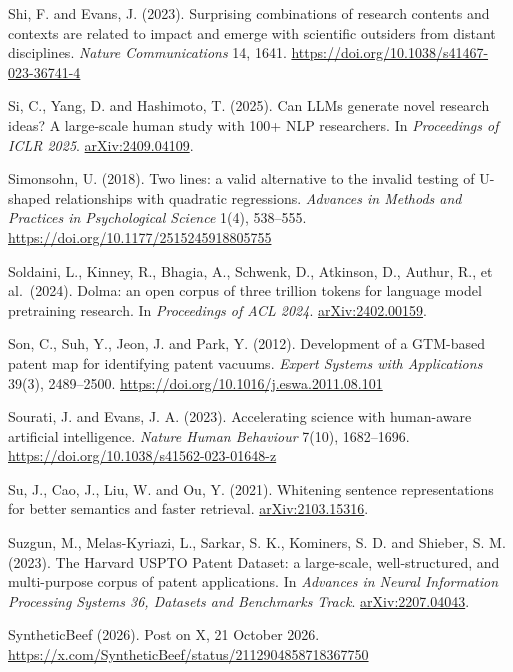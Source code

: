 \documentclass[
  10pt,
]{article}
\begin{document}
\hypertarget{ref-Shi2023}{}Shi, F. and
Evans, J. (2023). Surprising
combinations of research contents and
contexts are related to impact and
emerge with scientific outsiders from
distant disciplines. \emph{Nature
Communications} 14, 1641.
\url{https://doi.org/10.1038/s41467-023-36741-4}

\hypertarget{ref-Si2025}{}Si, C., Yang,
D. and Hashimoto, T. (2025). Can LLMs
generate novel research ideas? A
large-scale human study with 100+ NLP
researchers. In \emph{Proceedings of
ICLR 2025}.
\href{https://arxiv.org/abs/2409.04109}{arXiv:2409.04109}.

\hypertarget{ref-Simonsohn2018}{}Simonsohn,
U. (2018). Two lines: a valid
alternative to the invalid testing of
U-shaped relationships with quadratic
regressions. \emph{Advances in Methods
and Practices in Psychological Science}
1(4), 538--555.
\url{https://doi.org/10.1177/2515245918805755}

\hypertarget{ref-Soldaini2024}{}Soldaini,
L., Kinney, R., Bhagia, A., Schwenk, D.,
Atkinson, D., Authur, R., et al.~(2024).
Dolma: an open corpus of three trillion
tokens for language model pretraining
research. In \emph{Proceedings of ACL
2024}.
\href{https://arxiv.org/abs/2402.00159}{arXiv:2402.00159}.

\hypertarget{ref-Son2012}{}Son, C., Suh,
Y., Jeon, J. and Park, Y. (2012).
Development of a GTM-based patent map
for identifying patent vacuums.
\emph{Expert Systems with Applications}
39(3), 2489--2500.
\url{https://doi.org/10.1016/j.eswa.2011.08.101}

\hypertarget{ref-Sourati2023}{}Sourati,
J. and Evans, J. A. (2023). Accelerating
science with human-aware artificial
intelligence. \emph{Nature Human
Behaviour} 7(10), 1682--1696.
\url{https://doi.org/10.1038/s41562-023-01648-z}

\hypertarget{ref-Su2021}{}Su, J., Cao,
J., Liu, W. and Ou, Y. (2021). Whitening
sentence representations for better
semantics and faster retrieval.
\href{https://arxiv.org/abs/2103.15316}{arXiv:2103.15316}.

\hypertarget{ref-Suzgun2023}{}Suzgun,
M., Melas-Kyriazi, L., Sarkar, S. K.,
Kominers, S. D. and Shieber, S. M.
(2023). The Harvard USPTO Patent
Dataset: a large-scale, well-structured,
and multi-purpose corpus of patent
applications. In \emph{Advances in
Neural Information Processing Systems
36, Datasets and Benchmarks Track}.
\href{https://arxiv.org/abs/2207.04043}{arXiv:2207.04043}.

\hypertarget{ref-SyntheticBeef2026}{}SyntheticBeef
(2026). Post on X, 21 October 2026.
\url{https://x.com/SyntheticBeef/status/2112904858718367750}
\end{document}

